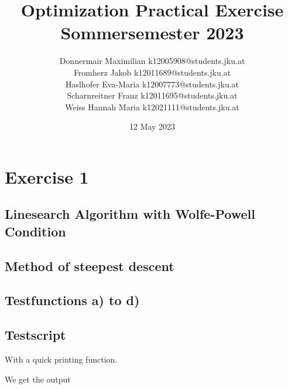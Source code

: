 \documentclass{article}
\title{Optimization Practical Exercise \\ Sommersemester 2023}
\author{Donnermair Maximilian k12005908@students.jku.at\\ Fromherz Jakob k12011689@students.jku.at\\Haslhofer Eva-Maria  k12007773@students.jku.at \\ Scharnreitner Franz k12011695@students.jku.at\\ Weiss Hannah Maria k12021111@students.jku.at } %
\date{12 May 2023}
\begin{document}
	\maketitle
	
	\newpage
	
	\section{Exercise 1}
	
	\subsection{Linesearch Algorithm with Wolfe-Powell Condition}
	
	
	\subsection{Method of steepest descent}
	
	
	
	\subsection{Testfunctions a) to d)}
	
	
	
	
	
	
	
	
	\subsection{Testscript}
	
	
	With a quick printing function.
	
	
	We get the output
	
\end{document}
